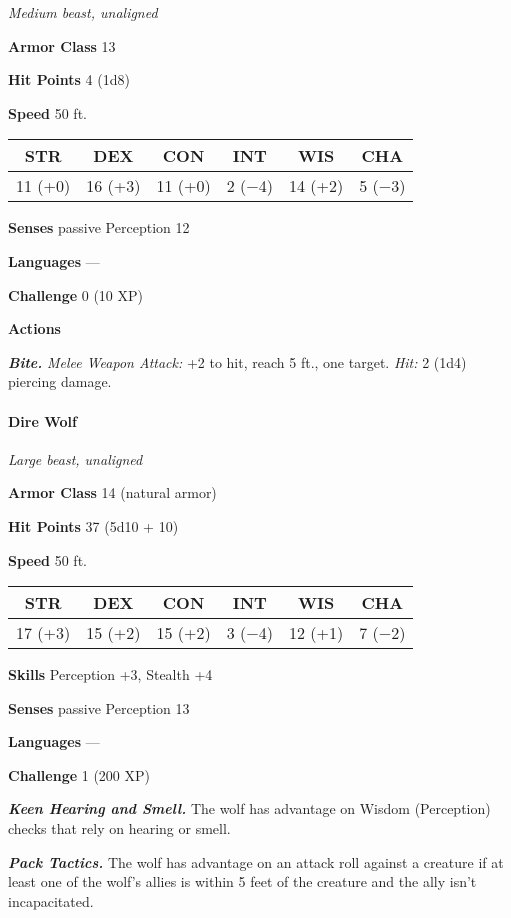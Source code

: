 \documentclass[
]{article}
\begin{document}
\emph{Medium beast, unaligned}

\textbf{Armor Class} 13

\textbf{Hit Points} 4 (1d8)

\textbf{Speed} 50 ft.

\begin{longtable}[]{@{}cccccc@{}}
\toprule
STR & DEX & CON & INT & WIS & CHA\tabularnewline
\midrule
\endhead
11 (+0) & 16 (+3) & 11 (+0) & 2 (−4) & 14 (+2) & 5 (−3)\tabularnewline
\bottomrule
\end{longtable}

\textbf{Senses} passive Perception 12

\textbf{Languages} ---

\textbf{Challenge} 0 (10 XP)

\textbf{Actions}

\emph{\textbf{Bite.}} \emph{Melee Weapon Attack:} +2 to hit, reach 5
ft., one target. \emph{Hit:} 2 (1d4) piercing damage.

\hypertarget{dire-wolf}{%
\paragraph{Dire Wolf}\label{dire-wolf}}

\emph{Large beast, unaligned}

\textbf{Armor Class} 14 (natural armor)

\textbf{Hit Points} 37 (5d10 + 10)

\textbf{Speed} 50 ft.

\begin{longtable}[]{@{}cccccc@{}}
\toprule
STR & DEX & CON & INT & WIS & CHA\tabularnewline
\midrule
\endhead
17 (+3) & 15 (+2) & 15 (+2) & 3 (−4) & 12 (+1) & 7 (−2)\tabularnewline
\bottomrule
\end{longtable}

\textbf{Skills} Perception +3, Stealth +4

\textbf{Senses} passive Perception 13

\textbf{Languages} ---

\textbf{Challenge} 1 (200 XP)

\emph{\textbf{Keen Hearing and Smell.}} The wolf has advantage on Wisdom
(Perception) checks that rely on hearing or smell.

\emph{\textbf{Pack Tactics.}} The wolf has advantage on an attack roll
against a creature if at least one of the wolf's allies is within 5 feet
of the creature and the ally isn't incapacitated.
\end{document}
